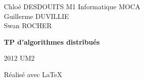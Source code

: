 \documentclass[a4paper]{report}
\begin{document}
\large
\setlength{\parskip}{5mm plus2mm minus2mm}
\lstset{language=C, showstringspaces=false, numbers=left, numberstyle=\tiny, tabsize=4}

 
{\setlength{\parindent}{0cm}
Chloé DESDOUITS \hfill M1 Informatique MOCA\\
Guillerme DUVILLIE \\
Swan ROCHER
}
\vfill
{\centering \Huge \bfseries TP d'algorithmes distribués\par}
\vfill
2012 \hfill UM2

\tableofcontents
\thispagestyle{empty}















\vfill
{\raggedleft Réalisé avec \LaTeX{} \par}
\end{document}
